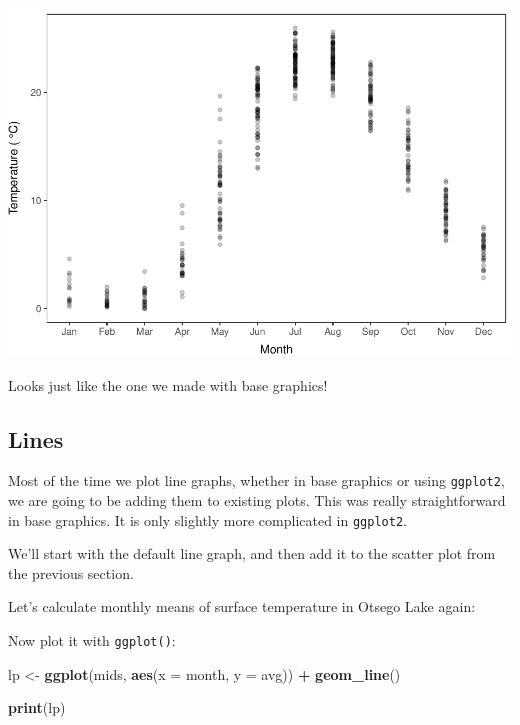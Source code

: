 \documentclass[
]{book}
\newenvironment{Shaded}{\begin{snugshade}}{\end{snugshade}}
\newcommand{\DataTypeTok}[1]{\textcolor[rgb]{0.13,0.29,0.53}{#1}}
\newcommand{\KeywordTok}[1]{\textcolor[rgb]{0.13,0.29,0.53}{\textbf{#1}}}
\newcommand{\NormalTok}[1]{#1}
\newcommand{\OperatorTok}[1]{\textcolor[rgb]{0.81,0.36,0.00}{\textbf{#1}}}
\newcommand{\StringTok}[1]{\textcolor[rgb]{0.31,0.60,0.02}{#1}}
\begin{document}
\includegraphics{worstr_files/figure-latex/unnamed-chunk-108-1.pdf}

Looks just like the one we made with base graphics!

\hypertarget{gglines}{%
\subsection{Lines}\label{gglines}}

Most of the time we plot line graphs, whether in base graphics or using \texttt{ggplot2}, we are going to be adding them to existing plots. This was really straightforward in base graphics. It is only slightly more complicated in \texttt{ggplot2}.

We'll start with the default line graph, and then add it to the scatter plot from the previous section.

Let's calculate monthly means of surface temperature in Otsego Lake again:

\begin{Shaded}
\end{Shaded}

Now plot it with \texttt{ggplot()}:

\begin{Shaded}
\begin{Highlighting}[]
\NormalTok{lp <-}\StringTok{ }\KeywordTok{ggplot}\NormalTok{(mids, }\KeywordTok{aes}\NormalTok{(}\DataTypeTok{x =}\NormalTok{ month, }\DataTypeTok{y =}\NormalTok{ avg)) }\OperatorTok{+}
\StringTok{  }\KeywordTok{geom_line}\NormalTok{()}

\KeywordTok{print}\NormalTok{(lp)}
\end{Highlighting}
\end{Shaded}
\end{document}
